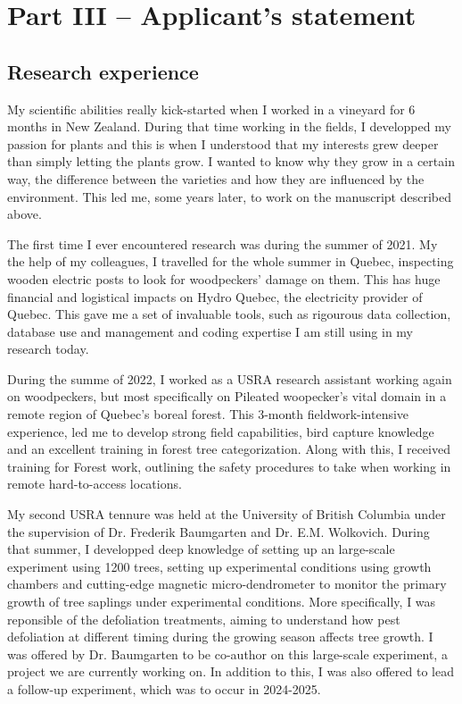 \documentclass{article}
\begin{document}
\section*{Part III – Applicant’s statement}

\subsection*{Research experience}
My scientific abilities really kick-started when I worked in a vineyard for 6 months in New Zealand. During that time working in the fields, I developped my passion for plants and this is when I understood that my interests grew deeper than simply letting the plants grow. I wanted to know why they grow in a certain way, the difference between the varieties and how they are influenced by the environment. This led me, some years later, to work on the manuscript described above. 

The first time I ever encountered research was during the summer of 2021. My the help of my colleagues, I travelled for the whole summer in Quebec, inspecting wooden electric posts to look for woodpeckers' damage on them. This has huge financial and logistical impacts on Hydro Quebec, the electricity provider of Quebec. This gave me a set of invaluable tools, such as rigourous data collection, database use and management and coding expertise I am still using in my research today.

During the summe of 2022, I worked as a USRA research assistant working again on woodpeckers, but most specifically on Pileated woopecker's vital domain in a remote region of Quebec's boreal forest. This 3-month fieldwork-intensive experience, led me to develop strong field capabilities, bird capture knowledge and an excellent training in forest tree categorization. Along with this, I received training for Forest work, outlining the safety procedures to take when working in remote hard-to-access locations. 

My second USRA tennure was held at the University of British Columbia under the supervision of Dr. Frederik Baumgarten and Dr. E.M. Wolkovich. During that summer, I developped deep knowledge of setting up an large-scale experiment using 1200 trees, setting up experimental conditions using growth chambers and cutting-edge magnetic micro-dendrometer to monitor the primary growth of tree saplings under experimental conditions. More specifically, I was reponsible of the defoliation treatments, aiming to understand how pest defoliation at different timing during the growing season affects tree growth. I was offered by Dr. Baumgarten to be co-author on this large-scale experiment, a project we are currently working on. In addition to this, I was also offered to lead a follow-up experiment, which was to occur in 2024-2025.
\end{document}
